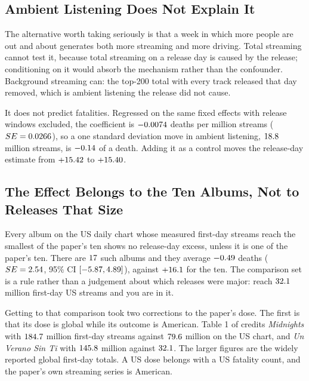 \documentclass[11pt]{article}
\begin{document}
\subsection{Ambient Listening Does Not Explain It}

The alternative worth taking seriously is that a week in which more people are out and
about generates both more streaming and more driving. Total streaming cannot test it,
because total streaming on a release day is caused by the release; conditioning on it
would absorb the mechanism rather than the confounder. Background streaming can: the
top-200 total with every track released that day removed, which is ambient listening the
release did not cause.

It does not predict fatalities. Regressed on the same fixed effects with release windows
excluded, the coefficient is $-0.0074$ deaths per million streams
($SE = 0.0266$), so a one standard deviation move in ambient listening,
$18.8$ million streams, is $-0.14$ of a death. Adding it as a
control moves the release-day estimate from $+15.42$ to
$+15.40$.



\subsection{The Effect Belongs to the Ten Albums, Not to Releases That Size}

Every album on the US daily chart whose measured first-day streams reach the smallest of
the paper's ten shows no release-day excess, unless it is one of the paper's ten. There
are $17$ such albums and they average $-0.49$ deaths
($SE = 2.54$, 95\% CI $[-5.87,
4.89]$), against $+16.1$ for the ten. The comparison set
is a rule rather than a judgement about which releases were major: reach
$32.1$ million first-day US streams and you are in it.

Getting to that comparison took two corrections to the paper's dose. The first is that
its dose is global while its outcome is American. Table 1 of
\citet{patel2026smartphones} credits \emph{Midnights} with $184.7$ million
first-day streams against $79.6$ million on the US chart, and
\emph{Un Verano Sin Ti} with $145.8$ million against
$32.1$. The larger figures are the widely reported global first-day
totals. A US dose belongs with a US fatality count, and the paper's own streaming series
is American.
\end{document}
